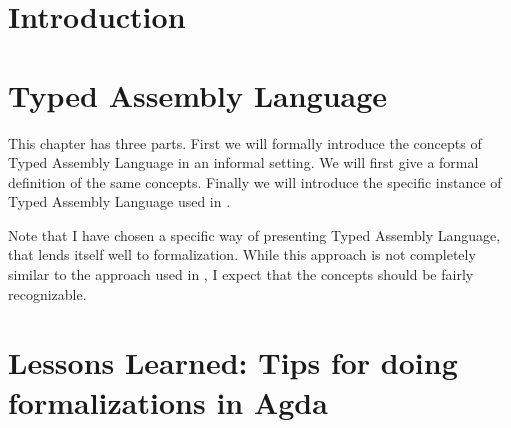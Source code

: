 




\begin{titlepage}
\maketitle
\end{titlepage}
\tableofcontents



\chapter{Introduction}




\chapter{Typed Assembly Language}
This chapter has three parts. First we will formally introduce the concepts of
Typed Assembly Language in an informal setting. We will first give a formal
definition of the same concepts. Finally we will introduce the specific instance
of Typed Assembly Language used in \cite{STAL}.

Note that I have chosen a specific way of presenting Typed Assembly Language,
that lends itself well to formalization. While this approach is not completely
similar to the approach used in \cite{STAL}, I expect that the concepts should
be fairly recognizable.





\chapter{Lessons Learned: Tips for doing formalizations in Agda}




% 
% 
% 
% 
% 
% 
% 

% 
% 
% 
% 
% 
% 

\listoftodos[Notes]




